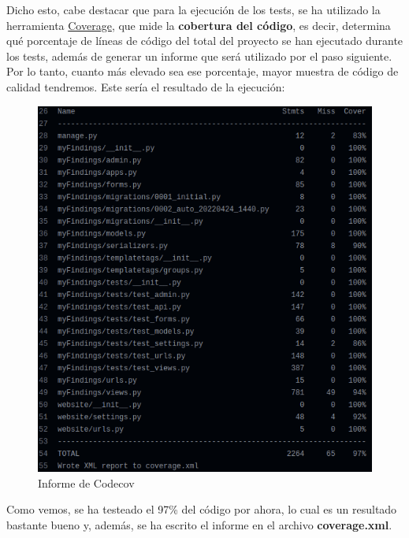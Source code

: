 \begin{enumerate}
\begin{enumerate}
\begin{enumerate}
                        Dicho esto, cabe destacar que para la ejecución de los tests, se ha
                        utilizado la herramienta \href{https://pypi.org/project/coverage/}
                        {Coverage}, que mide la \textbf{cobertura del código}, es decir,
                        determina qué porcentaje de líneas de código del total del proyecto
                        se han ejecutado durante los tests, además de generar un informe que
                        será utilizado por el paso siguiente. Por lo tanto, cuanto más
                        elevado sea ese porcentaje, mayor muestra de código de calidad
                        tendremos. Este sería el resultado de la ejecución:

                                \begin{figure}[H]
                                    \centering
                                    \includegraphics[scale=0.41]{imagenes/codecov-report.png}
                                    \caption{Informe de Codecov}
                                    \label{fig:codecov-report}
                                \end{figure}
                        
                        Como vemos, se ha testeado el 97\% del código por ahora, lo
                        cual es un resultado bastante bueno y, además, se ha escrito el
                        informe en el archivo \textbf{coverage.xml}.
                        

\end{enumerate}
\end{enumerate}
\end{enumerate}
